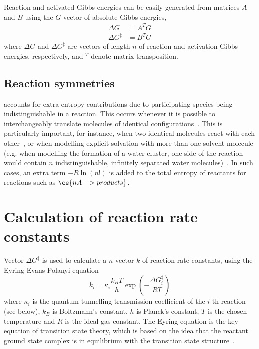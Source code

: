 Reaction and activated Gibbs energies can be easily generated from matrices $A$ and $B$ using the $G$ vector of absolute Gibbs energies,
% 
\begin{equation}
	\begin{split}
		\Delta G &= A^T G \\
		\Delta G^\ddagger &= B^T G
	\end{split}
\end{equation}
% 
where $\Delta G$ and $\Delta G^\ddagger$ are vectors of length $n$ of reaction and activation Gibbs energies,
respectively,
and $^T$ denote matrix transposition.

\subsection{Reaction symmetries}

\overreact accounts for extra entropy contributions due to participating species being indistinguishable in a reaction.
This occurs whenever it is possible to interchangeably translate molecules of identical configurations~\cite{Fern_ndez_Ramos_2007,Gilson_2010}.
This is particularly important,
for instance,
when two identical molecules react with each other~\cite{Fern_ndez_Ramos_2007,Gilson_2010},
or when modelling explicit solvation with more than one solvent molecule (e.g.
when modelling the formation of a water cluster,
one side of the reaction would contain $n$ indistinguishable,
infinitely separated water molecules)~\cite{Jensen_2015}.
In such cases,
an extra term $-R \ln{\left( n! \right)}$ is added to the total entropy of reactants for reactions such as $\ce{n A -> products}$.

\section{Calculation of reaction rate constants}%
\label{sec:rates}

Vector $\Delta G^\ddagger$ is used to calculate a $n$-vector $k$ of reaction rate constants,
using the Eyring-Evans-Polanyi equation~\cite{Eyring_1935,Evans_1935}
% 
\begin{equation}\label{eq:rate-consts}
	k_i = \kappa_i \frac{k_B T}{h}
	\exp \left(-\frac{\Delta G_i^\ddagger}{R T} \right)
\end{equation}
% 
where $\kappa_i$ is the quantum tunnelling transmission coefficient of the $i$-th reaction (see below),
$k_B$ is Boltzmann's constant,
$h$ is Planck's constant,
$T$ is the chosen temperature and $R$ is the ideal gas constant.
The Eyring equation is the key equation of transition state theory, which is based
on the idea that the reactant ground state complex is in equilibrium
with the transition state structure~\cite{TransitionStateTheory}.

